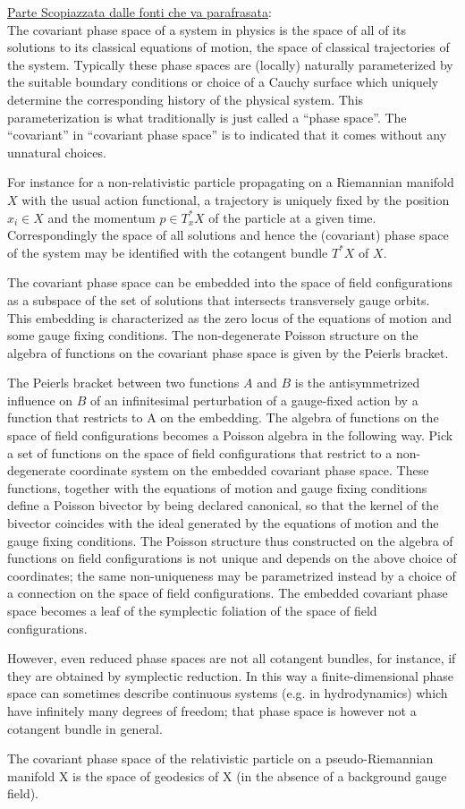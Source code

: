 \documentclass[Main]{subfiles}
\begin{document}
	
\begin{Warning}
	\underline{Parte Scopiazzata dalle fonti che va parafrasata}:\\

	The covariant phase space of a system in physics is the space of all of its solutions to its classical equations of motion, the space of classical trajectories of the system. 
 Typically these phase spaces are (locally) naturally parameterized by the suitable boundary conditions or choice of a Cauchy surface which uniquely determine the corresponding history of the physical system. This parameterization is what traditionally is just called a “phase space”. 
	The “covariant” in “covariant phase space” is to indicated that it comes without any unnatural choices.
	
 For instance for a non-relativistic particle propagating on a Riemannian manifold $X$ with the usual action functional, a trajectory is uniquely fixed by the position $x_i \in X$ and the momentum $p\in T^*_x X$ of the particle at a given time. 
 Correspondingly the space of all solutions and hence the (covariant) phase space of the system may be identified with the cotangent bundle $T^*X$ of $X$.

 The covariant phase space can be embedded into the space of field configurations as a subspace of the set of solutions that intersects transversely gauge orbits.  
 This embedding is characterized as the zero locus of the equations of motion and some gauge fixing conditions. The non-degenerate Poisson structure on the algebra of functions on the covariant phase space is given by the Peierls bracket.

 The Peierls bracket between two functions $A$ and $B$ is the antisymmetrized influence on $B$ of an infinitesimal perturbation of a gauge-fixed action by a function that restricts to A on the embedding. 
 The algebra of functions on the space of field configurations becomes a Poisson algebra in the following way. Pick a set of functions on the space of field configurations that restrict to a non-degenerate coordinate system on the embedded covariant phase space. 
 These functions, together with the equations of motion and gauge fixing conditions define a Poisson bivector by being declared canonical, so that the kernel of the bivector coincides with the ideal generated by the equations of motion and the gauge fixing conditions. 
The Poisson structure thus constructed on the algebra of functions on field configurations is not unique and depends on the above choice of coordinates; the same non-uniqueness may be parametrized instead by a choice of a connection on the space of field configurations. 
 The embedded covariant phase space becomes a leaf of the symplectic foliation of the space of field configurations.

 However, even reduced phase spaces are not all cotangent bundles, for instance, if they are obtained by symplectic reduction. 
 In this way a finite-dimensional phase space can sometimes describe continuous systems (e.g. in hydrodynamics) which have infinitely many degrees of freedom; that phase space is however not a cotangent bundle in general.
\end{Warning}

 \begin{example}
  The covariant phase space of the relativistic particle on a pseudo-Riemannian manifold X is the space of geodesics of X (in the absence of a background gauge field).
 \end{example}
\end{document}
